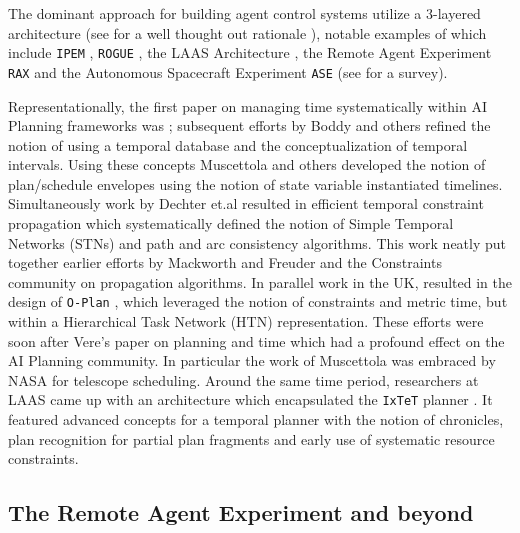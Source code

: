 The dominant approach for building agent control systems utilize a
$3$-layered architecture (see \cite{gat98} for a well thought out
rationale ), notable examples of which include
\texttt{IPEM} \cite{AmbrosIngerson88}, \texttt{ROGUE} \cite{Haigh98},
the LAAS Architecture \cite{alami:1998p820}, the Remote Agent
Experiment \texttt{RAX} \cite{mus98} and the Autonomous Spacecraft
Experiment \texttt{ASE} \cite{chien99} (see \cite{Knight01} for a
survey). 

Representationally, the first paper on managing time systematically
within AI Planning frameworks was \cite{dean87}; subsequent efforts by
Boddy and others \cite{Dean88,Boddy93} refined the notion of using a
temporal database and the conceptualization of temporal
intervals. Using these concepts Muscettola and others \cite{mus92,
  ghallab94, laborie95, cesta96} developed the notion of plan/schedule
envelopes using the notion of state variable instantiated
timelines. Simultaneously work by Dechter et.al \cite{dechter91}
resulted in efficient temporal constraint propagation which
systematically defined the notion of Simple Temporal Networks (STNs)
and path and arc consistency algorithms. This work neatly put together
earlier efforts by Mackworth and Freuder \cite{mackworth77, mack85}
and the Constraints community on propagation algorithms. In parallel
work in the UK, resulted in the design of \texttt{O-Plan}
\cite{currie91}, which leveraged the notion of constraints and metric
time, but within a Hierarchical Task Network (HTN) representation.
These efforts were soon after Vere’s paper on planning and time
\cite{vere83} which had a profound effect on the AI Planning
community. In particular the work of Muscettola \cite{mus94} was
embraced by NASA for telescope scheduling. Around the same time
period, researchers at LAAS came up with an architecture
\cite{alami:1998p820} which encapsulated the \texttt{IxTeT} planner
\cite{ghallab94} . It
featured advanced concepts for a temporal planner with the notion of
chronicles, plan recognition for partial plan fragments and early use
of systematic resource constraints. %

\subsection{The Remote Agent Experiment and beyond}
\label{sec:rabeyond}

